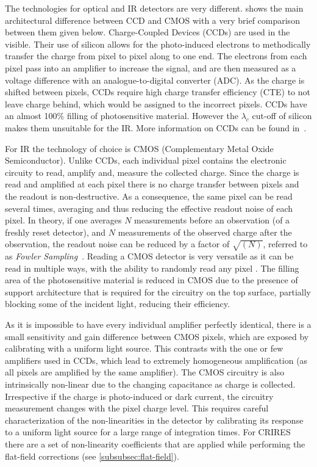 The technologies for optical and {IR} detectors are very different.
 shows the main architectural difference between {CCD} and {CMOS} with a very brief comparison between them given below.
Charge-Coupled Devices ({CCDs}) are used in the visible.
Their use of silicon allows for the photo-induced electrons to methodically transfer the charge from pixel to pixel along to one end.
The electrons from each pixel pass into an amplifier to increase the signal, and are then measured as a voltage difference with an analogue-to-digital converter (ADC).
As the charge is shifted between pixels, {CCDs} require high charge transfer efficiency (CTE) to not leave charge behind, which would be assigned to the incorrect pixels.
{CCDs} have an almost 100\% filling of photosensitive material.
However the \({\lambda}_{c}\) cut-off of silicon makes them unsuitable for the {IR}.
More information on {CCDs} can be found in~\citep{howell_handbook_2000}.

For {IR} the technology of choice is {CMOS} (Complementary Metal Oxide Semiconductor).
Unlike {CCDs}, each individual pixel contains the electronic circuity to read, amplify and, measure the collected charge.
Since the charge is read and amplified at each pixel there is no charge transfer between pixels and the readout is non-destructive.
As a consequence, the same pixel can be read several times, averaging and thus reducing the effective readout noise of each pixel.
In theory, if one averages \(N\) measurements before an observation (of a freshly reset detector), and \(N\) measurements of the observed charge after the observation, the readout noise can be reduced by a factor of \(\sqrt{(N)}\), referred to as \emph{Fowler Sampling}~\citep{fowler_demonstration_1990}.
Reading a {CMOS} detector is very versatile as it can be read in multiple ways, with the ability to randomly read any pixel .
The filling area of the photosensitive material is reduced in {CMOS} due to the presence of support architecture that is required for the circuitry on the top surface, partially blocking some of the incident light, reducing their efficiency.

As it is impossible to have every individual amplifier perfectly identical, there is a small sensitivity and gain difference between {CMOS} pixels, which are exposed by calibrating with a uniform light source.
This contrasts with the one or few amplifiers used in {CCDs}, which lead to extremely homogeneous amplification (as all pixels are amplified by the same amplifier).
The {CMOS} circuitry is also intrinsically non-linear due to the changing capacitance as charge is collected.
Irrespective if the charge is photo-induced or dark current, the circuitry measurement changes with the pixel charge level.
This requires careful characterization of the non-linearities in the detector by calibrating its response to a uniform light source for a large range of integration times.
For {CRIRES} there are a set of non-linearity coefficients that are applied while performing the flat-field corrections (see \cref{subsubsec:flat-field}).

